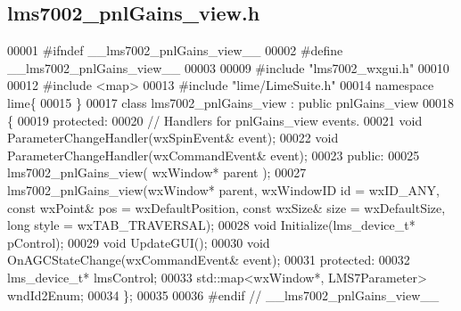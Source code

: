 \subsection{lms7002\+\_\+pnl\+Gains\+\_\+view.\+h}
\label{lms7002__pnlGains__view_8h_source}

\begin{DoxyCode}
00001 \textcolor{preprocessor}{#ifndef \_\_lms7002\_pnlGains\_view\_\_}
00002 \textcolor{preprocessor}{#define \_\_lms7002\_pnlGains\_view\_\_}
00003 
00009 \textcolor{preprocessor}{#include "lms7002_wxgui.h"}
00010 
00012 \textcolor{preprocessor}{#include <map>}
00013 \textcolor{preprocessor}{#include "lime/LimeSuite.h"}
00014 \textcolor{keyword}{namespace }lime\{
00015 \}
00017 \textcolor{keyword}{class }lms7002_pnlGains_view : \textcolor{keyword}{public} pnlGains_view
00018 \{
00019     \textcolor{keyword}{protected}:
00020     \textcolor{comment}{// Handlers for pnlGains\_view events.}
00021     \textcolor{keywordtype}{void} ParameterChangeHandler(wxSpinEvent& event);
00022         \textcolor{keywordtype}{void} ParameterChangeHandler(wxCommandEvent& event);
00023     \textcolor{keyword}{public}:
00025     lms7002_pnlGains_view( wxWindow* parent );
00027     lms7002_pnlGains_view(wxWindow* parent, wxWindowID \textcolor{keywordtype}{id} = wxID\_ANY, \textcolor{keyword}{const} wxPoint& pos = 
      wxDefaultPosition, \textcolor{keyword}{const} wxSize& size = wxDefaultSize, \textcolor{keywordtype}{long} style = wxTAB\_TRAVERSAL);
00028     \textcolor{keywordtype}{void} Initialize(lms_device_t* pControl);
00029     \textcolor{keywordtype}{void} UpdateGUI();
00030     \textcolor{keywordtype}{void} OnAGCStateChange(wxCommandEvent& event);
00031 \textcolor{keyword}{protected}:
00032     lms_device_t* lmsControl;
00033     std::map<wxWindow*, LMS7Parameter> wndId2Enum;
00034 \};
00035 
00036 \textcolor{preprocessor}{#endif // \_\_lms7002\_pnlGains\_view\_\_}
\end{DoxyCode}
